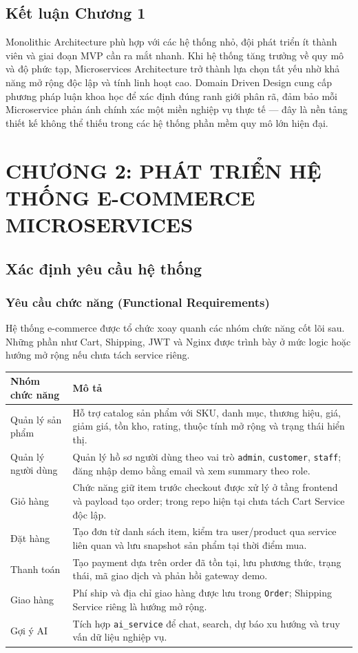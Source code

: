 \documentclass[12pt,a4paper]{article}
\begin{document}
\subsection{Kết luận Chương 1}
Monolithic Architecture phù hợp với các hệ thống nhỏ, đội phát triển ít thành viên và giai đoạn
MVP cần ra mắt nhanh. Khi hệ thống tăng trưởng về quy mô và độ phức tạp, Microservices
Architecture trở thành lựa chọn tất yếu nhờ khả năng mở rộng độc lập và tính linh hoạt cao.
Domain Driven Design cung cấp phương pháp luận khoa học để xác định đúng ranh giới phân rã,
đảm bảo mỗi Microservice phản ánh chính xác một miền nghiệp vụ thực tế --- đây là nền tảng
thiết kế không thể thiếu trong các hệ thống phần mềm quy mô lớn hiện đại.

\section{CHƯƠNG 2: PHÁT TRIỂN HỆ THỐNG E-COMMERCE MICROSERVICES}
\subsection{Xác định yêu cầu hệ thống}
\subsubsection{Yêu cầu chức năng (Functional Requirements)}
\noindent
Hệ thống e-commerce được tổ chức xoay quanh các nhóm chức năng cốt lõi sau. Những phần như Cart, Shipping, JWT và Nginx được trình bày ở mức logic hoặc hướng mở rộng nếu chưa tách service riêng.

\begin{longtable}{p{3.9cm}p{8.9cm}}
\toprule
\textbf{Nhóm chức năng} & \textbf{Mô tả} \\
\midrule
Quản lý sản phẩm & Hỗ trợ catalog sản phẩm với SKU, danh mục, thương hiệu, giá, giảm giá, tồn kho, rating, thuộc tính mở rộng và trạng thái hiển thị. \\
Quản lý người dùng & Quản lý hồ sơ người dùng theo vai trò \texttt{admin}, \texttt{customer}, \texttt{staff}; đăng nhập demo bằng email và xem summary theo role. \\
Giỏ hàng & Chức năng giữ item trước checkout được xử lý ở tầng frontend và payload tạo order; trong repo hiện tại chưa tách Cart Service độc lập. \\
Đặt hàng & Tạo đơn từ danh sách item, kiểm tra user/product qua service liên quan và lưu snapshot sản phẩm tại thời điểm mua. \\
Thanh toán & Tạo payment dựa trên order đã tồn tại, lưu phương thức, trạng thái, mã giao dịch và phản hồi gateway demo. \\
Giao hàng & Phí ship và địa chỉ giao hàng được lưu trong \texttt{Order}; Shipping Service riêng là hướng mở rộng. \\
Gợi ý AI & Tích hợp \texttt{ai\_service} để chat, search, dự báo xu hướng và truy vấn dữ liệu nghiệp vụ. \\
\bottomrule
\end{longtable}
\end{document}
